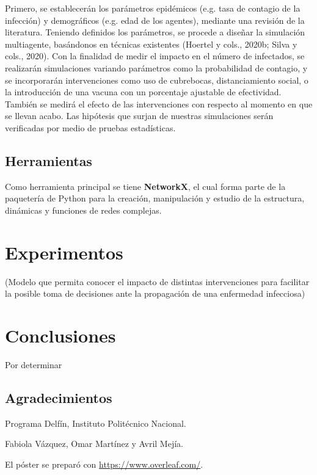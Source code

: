 \documentclass{sciposter}
\begin{document}
\begin{multicols}{2}
Primero, se establecerán los parámetros epidémicos (e.g. tasa de contagio de la infección) y demográficos (e.g. edad de los agentes), mediante una revisión de la literatura. Teniendo definidos los parámetros, se procede a diseñar la simulación multiagente, basándonos en técnicas existentes (Hoertel y cols., 2020b; Silva y cols., 2020). Con la finalidad de medir el impacto en el número de infectados, se realizarán simulaciones variando parámetros como la probabilidad
de contagio, y se incorporarán intervenciones como uso de cubrebocas, distanciamiento social, o la introducción de una vacuna con un porcentaje ajustable de efectividad. También se medirá el efecto de las intervenciones con respecto al momento en que se llevan acabo. Las hipótesis que surjan de nuestras simulaciones serán verificadas por medio de pruebas estadísticas.

\subsection*{Herramientas}

Como herramienta principal se tiene \textbf{NetworkX}, el cual forma parte de la paquetería de Python para la creación, manipulación y estudio de la estructura, dinámicas y funciones de redes complejas.

\section{Experimentos}

(Modelo que permita conocer el impacto de distintas intervenciones para facilitar la posible toma de decisiones ante la propagación de una enfermedad infecciosa)

\section{Conclusiones}

Por determinar

\subsection*{Agradecimientos}

{\small Programa Delfín, Instituto Politécnico Nacional.
    
    Fabiola Vázquez, Omar Martínez y Avril Mejía.
    
    El póster se preparó con \url{https://www.overleaf.com/}.}

\end{multicols}



\end{document}
